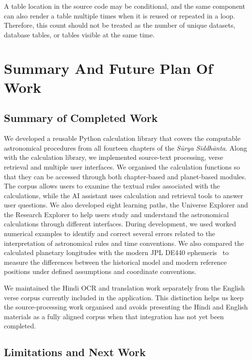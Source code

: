 \documentclass[12pt,a4paper,oneside]{report}
\newcommand{\surya}{Sūrya Siddhānta\xspace}
\begin{document}
A table location in the source code may be conditional, and the same component can also render a table multiple times when it is reused or repeated in a loop. Therefore, this count should not be treated as the number of unique datasets, database tables, or tables visible at the same time.

\chapter{Summary And Future Plan Of Work}

\section{Summary of Completed Work}

We developed a reusable Python calculation library that covers the computable astronomical procedures from all fourteen chapters of the \emph{\surya}. Along with the calculation library, we implemented source-text processing, verse retrieval and multiple user interfaces. We organised the calculation functions so that they can be accessed through both chapter-based and planet-based modules. The corpus allows users to examine the textual rules associated with the calculations, while the AI assistant uses calculation and retrieval tools to answer user questions. We also developed eight learning paths, the Universe Explorer and the Research Explorer to help users study and understand the astronomical calculations through different interfaces. During development, we used worked numerical examples to identify and correct several errors related to the interpretation of astronomical rules and time conventions. We also compared the calculated planetary longitudes with the modern JPL DE440 ephemeris~\cite{Park2021DE440,nigam2026de440} to measure the differences between the historical model and modern reference positions under defined assumptions and coordinate conventions.

We maintained the Hindi OCR and translation work separately from the English verse corpus currently included in the application. This distinction helps us keep the source-processing work organised and avoids presenting the Hindi and English materials as a fully aligned corpus when that integration has not yet been completed.

\section{Limitations and Next Work}
\end{document}
